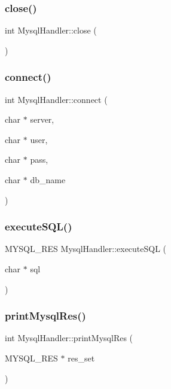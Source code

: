 \subsubsection{\texorpdfstring{close()}{close()}}
{\footnotesize\ttfamily int Mysql\+Handler\+::close (\begin{DoxyParamCaption}{ }\end{DoxyParamCaption})}

\mbox{\label{classMysqlHandler_acd74d4ee6a2853d07218cd7a300ee6d2}} 
\subsubsection{\texorpdfstring{connect()}{connect()}}
{\footnotesize\ttfamily int Mysql\+Handler\+::connect (\begin{DoxyParamCaption}\item[{char $\ast$}]{server,  }\item[{char $\ast$}]{user,  }\item[{char $\ast$}]{pass,  }\item[{char $\ast$}]{db\+\_\+name }\end{DoxyParamCaption})}

\mbox{\label{classMysqlHandler_abee4d47196df8c42420fe771508a6ff9}} 
\subsubsection{\texorpdfstring{execute\+S\+Q\+L()}{executeSQL()}}
{\footnotesize\ttfamily M\+Y\+S\+Q\+L\+\_\+\+R\+ES Mysql\+Handler\+::execute\+S\+QL (\begin{DoxyParamCaption}\item[{char $\ast$}]{sql }\end{DoxyParamCaption})}

\mbox{\label{classMysqlHandler_affb80fba704894dca83d563f6582edc0}} 
\subsubsection{\texorpdfstring{print\+Mysql\+Res()}{printMysqlRes()}}
{\footnotesize\ttfamily int Mysql\+Handler\+::print\+Mysql\+Res (\begin{DoxyParamCaption}\item[{M\+Y\+S\+Q\+L\+\_\+\+R\+ES $\ast$}]{res\+\_\+set }\end{DoxyParamCaption})}



